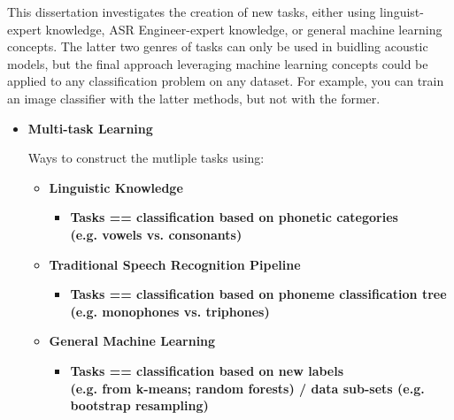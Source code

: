 \documentclass[10pt,a4paper]{article}
\begin{document}
This dissertation investigates the creation of new tasks, either using linguist-expert knowledge, ASR Engineer-expert knowledge, or general machine learning concepts. The latter two genres of tasks can only be used in buidling acoustic models, but the final approach leveraging machine learning concepts could be applied to any classification problem on any dataset. For example, you can train an image classifier with the latter methods, but not with the former.


\begin{itemize}

\item \textbf{Multi-task Learning}

Ways to construct the mutliple tasks using:
  
  \begin{itemize}
    
  \item \textbf{Linguistic Knowledge}
    
  \begin{itemize}  
  \item \textbf{Tasks == classification based on phonetic categories  \\ (e.g. vowels vs. consonants)}
  \end{itemize}
  
  \item \textbf{Traditional Speech Recognition Pipeline}
  \begin{itemize}  
  \item \textbf{Tasks == classification based on phoneme classification tree \\ (e.g. monophones vs. triphones)}
  \end{itemize}
    
  \item \textbf{General Machine Learning}
  \begin{itemize}  
  \item \textbf{Tasks == classification based on new labels \\ (e.g. from k-means; random forests) / data sub-sets (e.g. bootstrap resampling)}
  \end{itemize}
  \end{itemize}
  
\end{itemize}
\end{document}
